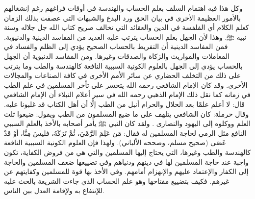 وكل هذا فيه اهتمام السلف بعلم الحساب والهندسة في أوقات فراغهم رغم إنشغالهم بالأمور العظيمة الأخرى في بيان الحق ورد البدع والشبهات التي عصفت بذلك الزمان كعلم الكلام أي الفلفسة في الدين والعقائد التي تخالف صريح كتاب الله جل جلاله وسنة نبيه ﷺ. وهذا لأن الجهل بعلم الحساب يترتب عليه العديد من المفاسد الدينية والدنيوية. فمن المفاسد الدينية أن التفريط بالحساب الصحيح يؤدي إلى الظلم والفساد في المعاملات والمواريث والزكاة والصدقات وغيرها. ومن المفاسد الدنيوية أن الجهل بالحساب يؤدي إلى الجهل بالعلوم الكونية السببية النافعة كالهندسة والطب وما يترتب على ذلك من التخلف الحضاري عن سائر الأمم الأخرى في كافة الصناعات والمجالات الأخرى. وقد كان الإمام الشافعي رحمه الله يتحسر على تأخر المسلمين في علم الطب في زمانه كما نقل ذلك الإمام الذهبي رحمه الله في سير أعلام النبلاء أن الإمام الشافعي قال: لا أعلم علمًا بعد الحلال والحرام أنبل من الطب إلَّا أن أهل الكتاب قد غلبونا عليه. وقال حرملة: كان الشافعي يتلهف على ما ضيع المسلمون من الطب ويقول: ضيعوا ثلث العلم ووكلوه إلى اليهود والنصارى \href{https://shamela.ws/book/22669/4486#p7}{\faExternalLink} \cite{dahabi_Siyar}. ولقد كان النبي ﷺ يأمر أصحابه بالأخذ بالعلم السببي النافع مثل الرمي لحاجة المسلمين له فقال: مَن عَلِمَ الرَّمْيَ، ثُمَّ تَرَكَهُ، فليسَ مِنَّا، أوْ قدْ عَصَى {\footnotesize (صحيح مسلم، وصححه الألباني)}. ولهذا فإن العلوم الكونية السببية النافعة كالهندسة والطب وغيرها، التي يحتاج إليها المسلمين والتي هي من فروض الكفاية، تكون واجبة عند حاجة المسلمين لها في دينهم ودنياهم وفي تضييعها ضعف المسلمين والحاجة إلى الكفار والإعتماد عليهم والإنهزام أمامهم. وفي الأخذ بها قوة للمسلمين وكفايتهم عن غيرهم. فكيف بتضييع مفتاحها وهو علم الحساب الذي جاءت الشريعة بالحث عليه للإنتفاع به ولإقامة العدل بين الناس. 

